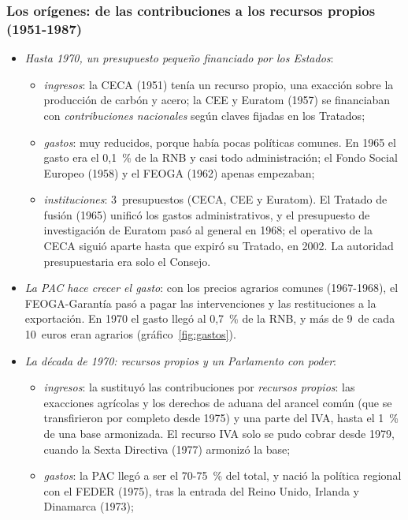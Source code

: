 \documentclass[11pt]{article}
\begin{document}
\subsubsection{Los orígenes: de las contribuciones a los recursos propios (1951-1987)}\label{sec:historia-origenes}

\begin{itemize}
\item \emph{Hasta 1970, un presupuesto pequeño financiado por los Estados}:
  \begin{itemize}
  \item \emph{ingresos}: la CECA (1951) tenía un recurso propio, una exacción sobre la producción de carbón y acero; la CEE y Euratom (1957) se financiaban con \emph{contribuciones nacionales} según claves fijadas en los Tratados;
  \item \emph{gastos}: muy reducidos, porque había pocas políticas comunes. En 1965 el gasto era el 0,1~\% de la RNB y casi todo administración; el Fondo Social Europeo (1958) y el FEOGA (1962) apenas empezaban;
  \item \emph{instituciones}: 3~presupuestos (CECA, CEE y Euratom). El Tratado de fusión (1965) unificó los gastos administrativos, y el presupuesto de investigación de Euratom pasó al general en 1968; el operativo de la CECA siguió aparte hasta que expiró su Tratado, en 2002. La autoridad presupuestaria era solo el Consejo.
  \end{itemize}
\item \emph{La PAC hace crecer el gasto}: con los precios agrarios comunes (1967-1968), el FEOGA-Garantía pasó a pagar las intervenciones y las restituciones a la exportación. En 1970 el gasto llegó al 0,7~\% de la RNB, y más de 9~de cada 10~euros eran agrarios (gráfico~\ref{fig:gastos}).
\item \emph{La década de 1970: recursos propios y un Parlamento con poder}:
  \begin{itemize}
  \item \emph{ingresos}: la  sustituyó las contribuciones por \emph{recursos propios}: las exacciones agrícolas y los derechos de aduana del arancel común (que se transfirieron por completo desde 1975) y una parte del IVA, hasta el 1~\% de una base armonizada. El recurso IVA solo se pudo cobrar desde 1979, cuando la Sexta Directiva (1977) armonizó la base;
  \item \emph{gastos}: la PAC llegó a ser el 70-75~\% del total, y nació la política regional con el FEDER (1975), tras la entrada del Reino Unido, Irlanda y Dinamarca (1973);

\end{itemize}
\end{itemize}
\end{document}
